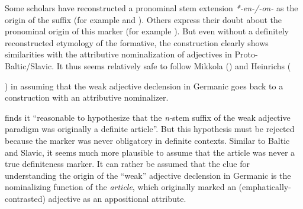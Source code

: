 Some scholars have reconstructed a pronominal stem extension \textit{*-en-/-on-} as the origin of the suffix (for example \citealt[52]{mikkola1950} and \citealt[67]{heinrichs1954}). Others express their doubt about the pronominal origin of this marker (for example \citealt[21 Footnote 6]{schmidt1959}). But even without a definitely reconstructed etymology of the formative, the construction clearly shows similarities with the attributive nominalization of adjectives in Proto-Baltic/Slavic. It thus seems relatively safe to follow Mikkola (\citeyear{mikkola1950}) and Heinrichs ({\citeyear{heinrichs1954}) in assuming that the weak adjective declension in Germanic goes back to a construction with an attributive nominalizer.

\citet[170]{ringe2006} finds it “reasonable to hypothesize that the \textit{n-}stem suffix of the weak adjective paradigm was originally a definite article”. But this hypothesis must be rejected because the marker was never obligatory in definite contexts. Similar to Baltic and Slavic, it seems much more plausible to assume that the article was never a true definiteness marker. It can rather be assumed that the clue for understanding the origin of the “weak” adjective declension in Germanic is the nominalizing function of the \textit{article}, which originally marked an (emphatically-contrasted) adjective as an appositional attribute.

}
